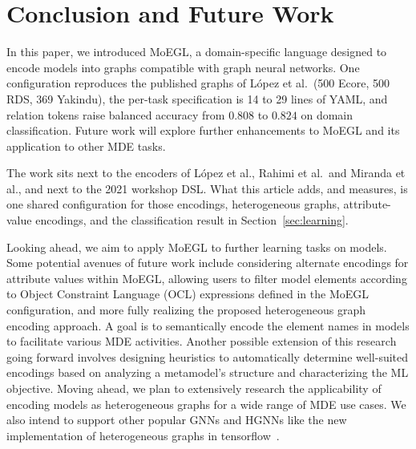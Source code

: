 \documentclass[journal,article,submit,moreauthors,technologies]{Definitions/mdpi}
\newcommand{\rev}[1]{#1}
\begin{document}
\section{Conclusion and Future Work} \label{Sec:conclusion}

In this paper, we introduced MoEGL, a domain-specific language designed to encode models into graphs compatible with graph neural networks. \rev{One configuration reproduces the published graphs of L\'opez et al.\ (500 Ecore, 500 RDS, 369 Yakindu), the per-task specification is 14 to 29 lines of YAML, and relation tokens raise balanced accuracy from $0.808$ to $0.824$ on domain classification.} Future work will explore further enhancements to MoEGL and its application to other MDE tasks.

\rev{The work sits next to the encoders of L\'opez et al., Rahimi et al.\ and Miranda et al., and next to the 2021 workshop DSL. What this article adds, and measures, is one shared configuration for those encodings, heterogeneous graphs, attribute-value encodings, and the classification result in Section~\ref{sec:learning}.}

Looking ahead, we aim to apply MoEGL to further learning tasks on models. Some potential avenues of future work include considering alternate encodings for attribute values within MoEGL, allowing users to filter model elements according to Object Constraint Language (OCL) expressions defined in the MoEGL configuration, and more fully realizing the proposed heterogeneous graph encoding approach. A goal is to semantically encode the element names in models to facilitate various MDE activities. Another possible extension of this research going forward involves designing heuristics to automatically determine well-suited encodings based on analyzing a metamodel's structure and characterizing the ML objective. Moving ahead, we plan to extensively research the applicability of encoding models as heterogeneous graphs for a wide range of MDE use cases. We also intend to support other popular GNNs and HGNNs like the new implementation of heterogeneous graphs in tensorflow~\cite{HPyG_Tensorflow}.

\vspace{6pt}


\end{document}
